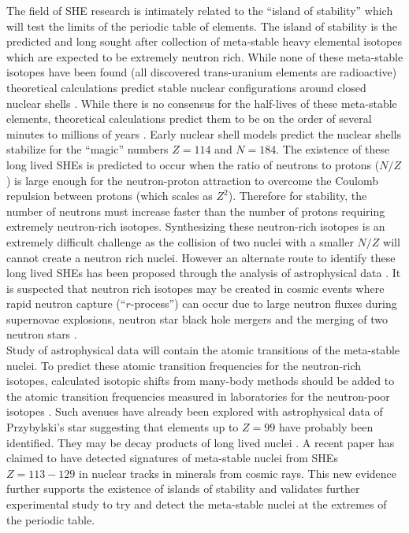 \documentclass[10pt,a4paper, twoside, openright]{report}
\begin{document}
\linebreak
The field of SHE research is intimately related to the ``island of stability''  which will test the limits of the periodic table of elements. The island of stability is the predicted and long sought after collection of meta-stable heavy elemental isotopes which are expected to be extremely neutron rich. While none of these meta-stable isotopes have been found (all discovered trans-uranium elements are radioactive) theoretical calculations predict stable nuclear configurations around closed nuclear shells \cite{Myers1966, Sobiczewski1966, Nilsson1969SHE, Nix1972}. While there is no consensus for the half-lives of these meta-stable elements, theoretical calculations predict them to be on the order of several minutes to millions of years \cite{Oganessian2017}. Early nuclear shell models predict the nuclear shells stabilize for the ``magic'' numbers $Z=114$ and $N=184$\cite{OUL2004, HHO2013, Leino2016, Oganessian2012}. The existence of these long lived SHEs is predicted to occur when the ratio of neutrons to protons ($N/Z$) is large enough for the neutron-proton attraction to overcome  the Coulomb repulsion between protons (which scales as $Z^2$). Therefore for stability, the number of neutrons must increase faster than the number of protons requiring extremely neutron-rich isotopes. Synthesizing these neutron-rich isotopes is an extremely difficult challenge as the collision of two nuclei with a smaller $N/Z$ will cannot create a neutron rich nuclei. However an alternate route to identify these long lived SHEs has been proposed through the analysis of astrophysical data \cite{DFW17, Akopian2015}. It is suspected that neutron rich isotopes may be created in cosmic events where rapid neutron capture (``$r$-process'') can occur due to large neutron fluxes during supernovae explosions, neutron star black hole mergers and the merging of two neutron stars \cite{Goriely2011, Fuller2017, Friebel2018, Schuetrumpf2015}. \\
\linebreak
Study of astrophysical data will contain the atomic transitions of the meta-stable nuclei. To predict these atomic transition frequencies for the neutron-rich isotopes, calculated isotopic shifts from many-body methods should be added to the atomic transition frequencies measured in laboratories for the neutron-poor isotopes \cite{DFW17}. Such avenues have already been explored with astrophysical data of  Przybylski's star suggesting that elements up to $Z=99$ have probably  been identified\cite{Polukhina2012, Gopka2008, Fivet2007}.  They may be decay products of long lived nuclei \cite{DFW17}. A recent paper \cite{Alexandrov2019} has claimed to  have detected signatures of meta-stable nuclei from SHEs $Z=113-129$ in nuclear tracks in minerals from cosmic rays. This new evidence further supports the existence of islands of stability and validates further experimental study to try and detect the meta-stable nuclei at the extremes of the periodic table.\\
\end{document}
